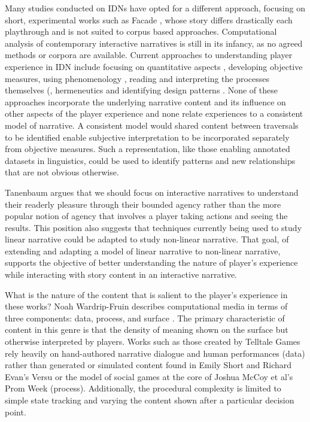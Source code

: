 Many studies conducted on IDNs have opted for a different approach,
focusing on short, experimental works such as Facade
\cite{Seif_El-Nasr2013-hp}, whose story differs drastically each
playthrough and is not suited to corpus based
approaches. Computational analysis of contemporary interactive
narratives is still in its infancy, as no agreed methods or corpora
are available. Current approaches to understanding player experience
in IDN include focusing on quantitative aspects \cite{Marczak2013-np},
developing objective measures\cite{Szilas2014-fd}, using phenomenology
\cite{Seif_El-Nasr2013-hp}, reading and interpreting the processes
themselves (\cite{Wardrip-fruin2006-je}, hermeneutics
\cite{Arjoranta2015-rw} and identifying design patterns
\cite{Reed2014-qw}. None of these approaches incorporate the
underlying narrative content and its influence on other aspects of the
player experience and none relate experiences to a consistent model of
narrative. A consistent model would shared content between traversals
to be identified enable subjective interpretation to be incorporated
separately from objective measures. Such a representation, like those
enabling annotated datasets in linguistics, could be used to identify
patterns and new relationships that are not obvious otherwise.

Tanenbaum argues that we should focus on interactive narratives to
understand their readerly pleasure through their bounded agency
\cite{Tanenbaum2011-yu} rather than the more popular notion of agency
that involves a player taking actions and seeing the results. This
position also suggests that techniques currently being used to study
linear narrative could be adapted to study non-linear narrative. That
goal, of extending and adapting a model of linear narrative to
non-linear narrative, supports the objective of better understanding
the nature of player's experience while interacting with story content
in an interactive narrative.

What is the nature of the content that is salient to the player's
experience in these works? Noah Wardrip-Fruin describes computational
media in terms of three components: data, process, and surface
\cite{Wardrip-Fruin2009-pe}. The primary characteristic of content in
this genre is that the density of meaning shown on the surface but
otherwise interpreted by players. Works such as those created by
Telltale Games rely heavily on hand-authored narrative dialogue and
human performances (data) rather than generated or simulated content
found in Emily Short and Richard Evan's Versu \cite{Evans2014-nk} or
the model of social games at the core of Joshua McCoy et al's Prom
Week (process). Additionally, the procedural complexity is limited to
simple state tracking and varying the content shown after a particular
decision point.

